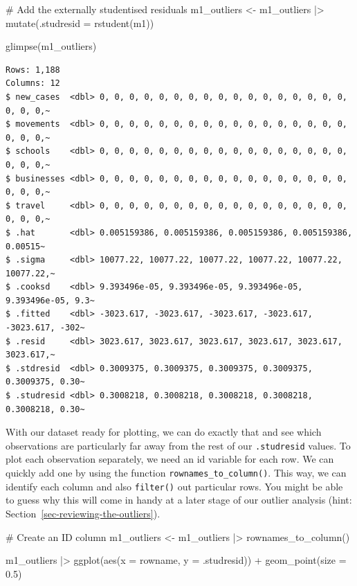 \documentclass[
  letterpaper,
]{krantz}
\makeatletter
\newenvironment{Shaded}{\begin{snugshade}}{\end{snugshade}}
\newcommand{\AttributeTok}[1]{\textcolor[rgb]{0.40,0.45,0.13}{#1}}
\newcommand{\CommentTok}[1]{\textcolor[rgb]{0.37,0.37,0.37}{#1}}
\newcommand{\FloatTok}[1]{\textcolor[rgb]{0.68,0.00,0.00}{#1}}
\newcommand{\FunctionTok}[1]{\textcolor[rgb]{0.28,0.35,0.67}{#1}}
\newcommand{\NormalTok}[1]{\textcolor[rgb]{0.00,0.23,0.31}{#1}}
\newcommand{\OtherTok}[1]{\textcolor[rgb]{0.00,0.23,0.31}{#1}}
\newcommand{\SpecialCharTok}[1]{\textcolor[rgb]{0.37,0.37,0.37}{#1}}
\newenvironment{kframe}{%
\medskip{}
\setlength{\fboxsep}{.8em}
 \def\at@end@of@kframe{}%
 \ifinner\ifhmode%
  \def\at@end@of@kframe{\end{minipage}}%
  \begin{minipage}{\columnwidth}%
 \fi\fi%
 \def\FrameCommand##1{\hskip\@totalleftmargin \hskip-\fboxsep
 \colorbox{shadecolor}{##1}\hskip-\fboxsep
     \hskip-\linewidth \hskip-\@totalleftmargin \hskip\columnwidth}%
 \MakeFramed {\advance\hsize-\width
   \@totalleftmargin\z@ \linewidth\hsize
   \@setminipage}}%
 {\par\unskip\endMakeFramed%
 \at@end@of@kframe}
\renewenvironment{Shaded}{\begin{kframe}}{\end{kframe}}
\makeatother
\begin{document}
\begin{Shaded}
\begin{Highlighting}[]
\CommentTok{\# Add the externally studentised residuals}
\NormalTok{m1\_outliers }\OtherTok{\textless{}{-}}
\NormalTok{  m1\_outliers }\SpecialCharTok{|\textgreater{}}
  \FunctionTok{mutate}\NormalTok{(}\AttributeTok{.studresid =} \FunctionTok{rstudent}\NormalTok{(m1))}

\FunctionTok{glimpse}\NormalTok{(m1\_outliers)}
\end{Highlighting}
\end{Shaded}

\begin{verbatim}
Rows: 1,188
Columns: 12
$ new_cases  <dbl> 0, 0, 0, 0, 0, 0, 0, 0, 0, 0, 0, 0, 0, 0, 0, 0, 0, 0, 0, 0,~
$ movements  <dbl> 0, 0, 0, 0, 0, 0, 0, 0, 0, 0, 0, 0, 0, 0, 0, 0, 0, 0, 0, 0,~
$ schools    <dbl> 0, 0, 0, 0, 0, 0, 0, 0, 0, 0, 0, 0, 0, 0, 0, 0, 0, 0, 0, 0,~
$ businesses <dbl> 0, 0, 0, 0, 0, 0, 0, 0, 0, 0, 0, 0, 0, 0, 0, 0, 0, 0, 0, 0,~
$ travel     <dbl> 0, 0, 0, 0, 0, 0, 0, 0, 0, 0, 0, 0, 0, 0, 0, 0, 0, 0, 0, 0,~
$ .hat       <dbl> 0.005159386, 0.005159386, 0.005159386, 0.005159386, 0.00515~
$ .sigma     <dbl> 10077.22, 10077.22, 10077.22, 10077.22, 10077.22, 10077.22,~
$ .cooksd    <dbl> 9.393496e-05, 9.393496e-05, 9.393496e-05, 9.393496e-05, 9.3~
$ .fitted    <dbl> -3023.617, -3023.617, -3023.617, -3023.617, -3023.617, -302~
$ .resid     <dbl> 3023.617, 3023.617, 3023.617, 3023.617, 3023.617, 3023.617,~
$ .stdresid  <dbl> 0.3009375, 0.3009375, 0.3009375, 0.3009375, 0.3009375, 0.30~
$ .studresid <dbl> 0.3008218, 0.3008218, 0.3008218, 0.3008218, 0.3008218, 0.30~
\end{verbatim}

With our dataset ready for plotting, we can do exactly that and see
which observations are particularly far away from the rest of our
\texttt{.studresid} values. To plot each observation separately, we need
an id variable for each row. We can quickly add one by using the
function \texttt{rownames\_to\_column()}. This way, we can identify each
column and also \texttt{filter()} out particular rows. You might be able
to guess why this will come in handy at a later stage of our outlier
analysis (hint: Section~\ref{sec-reviewing-the-outliers}).

\begin{Shaded}
\begin{Highlighting}[]
\CommentTok{\# Create an ID column}
\NormalTok{m1\_outliers }\OtherTok{\textless{}{-}}\NormalTok{ m1\_outliers }\SpecialCharTok{|\textgreater{}} \FunctionTok{rownames\_to\_column}\NormalTok{()}

\NormalTok{m1\_outliers }\SpecialCharTok{|\textgreater{}}
  \FunctionTok{ggplot}\NormalTok{(}\FunctionTok{aes}\NormalTok{(}\AttributeTok{x =}\NormalTok{ rowname,}
             \AttributeTok{y =}\NormalTok{ .studresid)) }\SpecialCharTok{+}
  \FunctionTok{geom\_point}\NormalTok{(}\AttributeTok{size =} \FloatTok{0.5}\NormalTok{)}
\end{Highlighting}
\end{Shaded}
\end{document}
